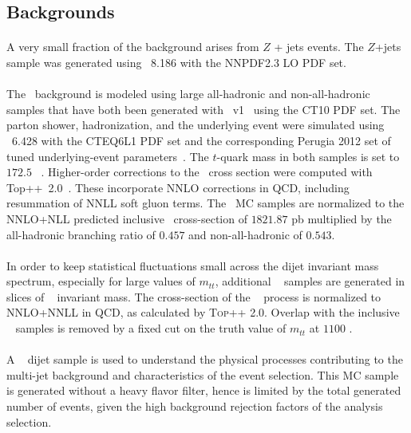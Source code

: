 \subsection{Backgrounds}
\paragraph{}
A very small fraction of the background arises from $Z$ + jets events. The $Z$+jets sample was generated using \pythia~8.186 with the NNPDF2.3 LO PDF set.

\paragraph{}
The \ttbar\ background is modeled using large all-hadronic and non-all-hadronic samples that have both been generated with \powhegbox\ v1~\cite{Alioli:2010xd} using the CT10 PDF set. 
The parton shower, hadronization, and the underlying event were simulated using \pythia~6.428 with the CTEQ6L1 PDF set and the corresponding Perugia 2012 set of tuned underlying-event parameters~\cite{Skands:2010ak}.
The $t$-quark mass in both samples is set to $172.5$ \GeV~.
Higher-order corrections to the \ttbar\ cross section were computed with Top++~2.0~\cite{Czakon:20142930}. These incorporate NNLO corrections in QCD, including resummation of NNLL soft gluon terms.
The \ttbar\ MC samples are normalized to the NNLO+NLL predicted inclusive \ttbar\ cross-section of
$1821.87$ pb multiplied by the all-hadronic branching ratio of $0.457$ and non-all-hadronic of $0.543$.

\paragraph{}
In order to keep statistical fluctuations small across the dijet invariant mass spectrum, especially for large values of $m_{tt}$, additional \ttbar~ samples are generated in slices of \ttbar~ invariant mass. The cross-section of the \ttbar~ process is normalized to NNLO+NNLL in QCD, as calculated by \textsc{Top++} 2.0. Overlap with the inclusive \ttbar~ samples is removed by a fixed cut on the truth value of $m_{tt}$ at $1100$ \GeV.

\paragraph{}
A \pythia~ dijet sample is used to understand the physical processes contributing to the multi-jet background and characteristics of the event selection. This MC sample is generated without a heavy flavor filter, hence is limited by the total generated number of events, given the high background rejection factors of the analysis selection.

